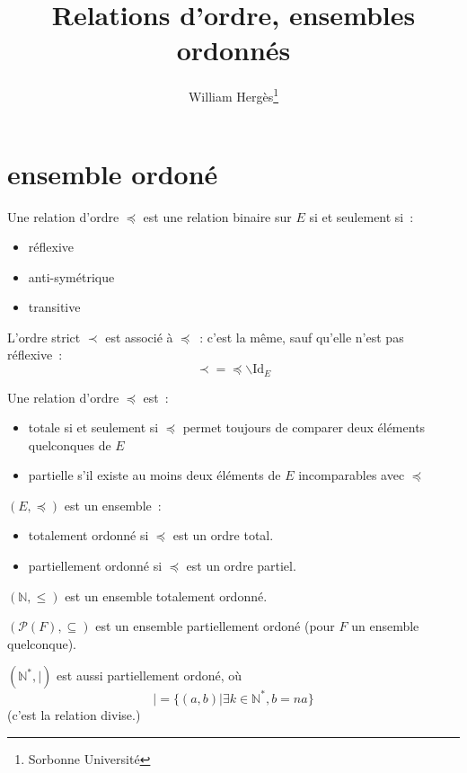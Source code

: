 \documentclass[a4paper, titlepage]{article}
\title{Relations d'ordre, ensembles ordonnés}
\author{William Hergès\thanks{Sorbonne Université}}
\begin{document}
	\maketitle
	\tableofcontents
	\newpage
    \section{ensemble ordoné}
    \begin{defn}
        Une relation d'ordre $\preceq$ est une relation binaire sur $E$ si et seulement si~:
        \begin{itemize}
            \item réflexive
            \item anti-symétrique
            \item transitive
        \end{itemize}

        L'ordre strict $\prec$ est associé à $\preceq$~: c'est la même, sauf qu'elle n'est pas réflexive~:
        $$ \prec = \preceq\backslash\mathrm{Id}_E $$
    \end{defn}
    \begin{defn}
        Une relation d'ordre $\preceq$ est~:
        \begin{itemize}
            \item totale si et seulement si $\preceq$ permet toujours de comparer deux éléments quelconques de $E$
            \item partielle s'il existe au moins deux éléments de $E$ incomparables avec $\preceq$
        \end{itemize}
    \end{defn}
    \begin{defn}
        $(E,\preceq)$ est un ensemble~:
        \begin{itemize}
            \item totalement ordonné si $\preceq$ est un ordre total.
            \item partiellement ordonné si $\preceq$ est un ordre partiel.
        \end{itemize}
    \end{defn}
    \begin{exemple}
        $(\mathbb{N},\leqslant )$ est un ensemble totalement ordonné.

        $(\mathcal{P}(F),\subseteq)$ est un ensemble partiellement ordoné (pour $F$ un ensemble quelconque).

        $(\mathbb{N}^*, |)$ est aussi partiellement ordoné, où
        $$ | = \{(a,b)|\exists k\in\mathbb{N}^*, b = na\} $$
        (c'est la relation divise.)
    \end{exemple}
\end{document}
